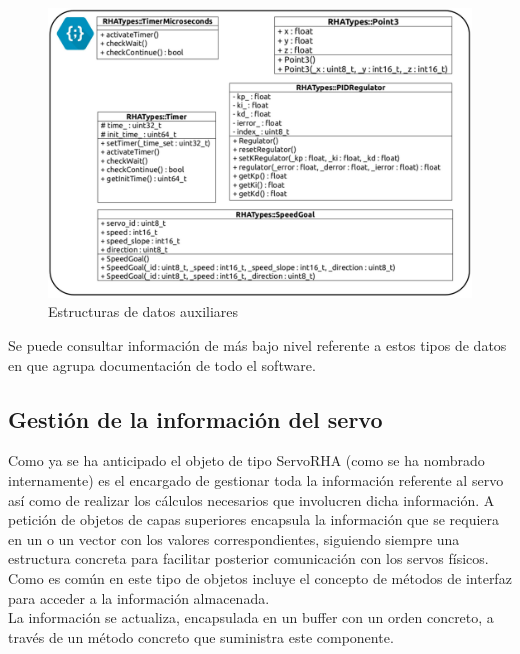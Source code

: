         \begin{figure}[H]
            \centering
            \includegraphics[width=1\textwidth]{figuras/Imagenes_SW/class_diagram_TRHA.jpg}
            \caption{Estructuras de datos auxiliares}
            \label{fig:SW:class_diagram_TRHA}
        \end{figure}

        Se puede consultar información de más bajo nivel referente a estos tipos de datos en \cite{rha_doc} que agrupa documentación de todo el software.

    \subsection{Gestión de la información del servo} \label{subsec:SW:servorha}
        Como ya se ha anticipado el objeto de tipo ServoRHA (como se ha nombrado internamente) es el encargado de gestionar toda la información referente al servo así como de realizar los cálculos necesarios que involucren dicha información. A petición de objetos de capas superiores encapsula la información que se requiera en un  o un vector con los valores correspondientes, siguiendo siempre una estructura concreta para facilitar posterior comunicación con los servos físicos. Como es común en este tipo de objetos incluye el concepto de métodos de interfaz para acceder a la información almacenada.
        \\
        
        La información se actualiza, encapsulada en un buffer con un orden concreto, a través de un método concreto que suministra este componente.
        \\
        
